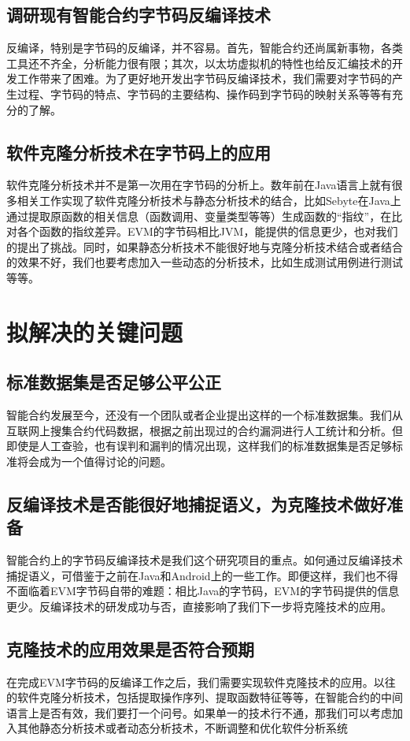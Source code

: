 \subsection{调研现有智能合约字节码反编译技术}

反编译，特别是字节码的反编译，并不容易。首先，智能合约还尚属新事物，各类工具还不齐全，分析能力很有限；其次，以太坊虚拟机的特性也给反汇编技术的开发工作带来了困难。为了更好地开发出字节码反编译技术，我们需要对字节码的产生过程、字节码的特点、字节码的主要结构、操作码到字节码的映射关系等等有充分的了解。

\subsection{软件克隆分析技术在字节码上的应用}

软件克隆分析技术并不是第一次用在字节码的分析上。数年前在Java语言上就有很多相关工作实现了软件克隆分析技术与静态分析技术的结合，比如Sebyte在Java上通过提取原函数的相关信息（函数调用、变量类型等等）生成函数的“指纹”，在比对各个函数的指纹差异。EVM的字节码相比JVM，能提供的信息更少，也对我们的提出了挑战。同时，如果静态分析技术不能很好地与克隆分析技术结合或者结合的效果不好，我们也要考虑加入一些动态的分析技术，比如生成测试用例进行测试等等。


\section{拟解决的关键问题}

\subsection{标准数据集是否足够公平公正}

智能合约发展至今，还没有一个团队或者企业提出这样的一个标准数据集。我们从互联网上搜集合约代码数据，根据之前出现过的合约漏洞进行人工统计和分析。但即使是人工查验，也有误判和漏判的情况出现，这样我们的标准数据集是否足够标准将会成为一个值得讨论的问题。

\subsection{反编译技术是否能很好地捕捉语义，为克隆技术做好准备}

智能合约上的字节码反编译技术是我们这个研究项目的重点。如何通过反编译技术捕捉语义，可借鉴于之前在Java和Android上的一些工作。即便这样，我们也不得不面临着EVM字节码自带的难题：相比Java的字节码，EVM的字节码提供的信息更少。反编译技术的研发成功与否，直接影响了我们下一步将克隆技术的应用。

\subsection{克隆技术的应用效果是否符合预期}

在完成EVM字节码的反编译工作之后，我们需要实现软件克隆技术的应用。以往的软件克隆分析技术，包括提取操作序列、提取函数特征等等，在智能合约的中间语言上是否有效，我们要打一个问号。如果单一的技术行不通，那我们可以考虑加入其他静态分析技术或者动态分析技术，不断调整和优化软件分析系统